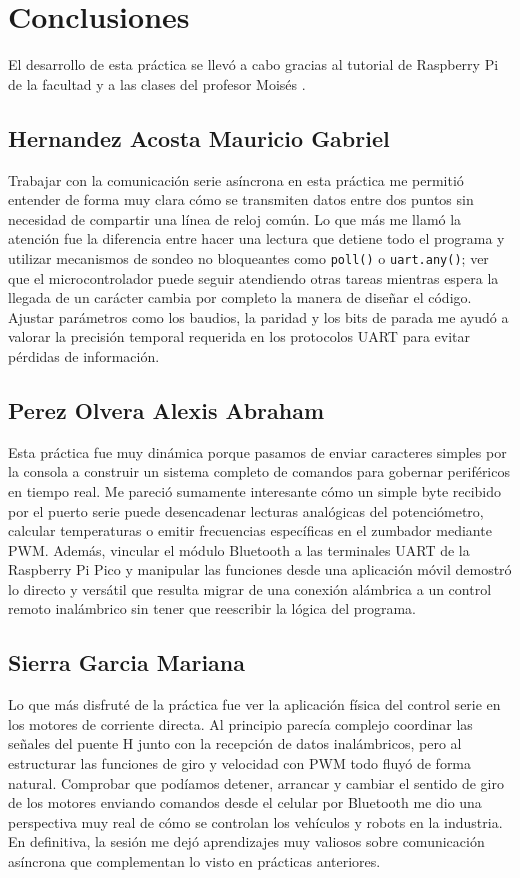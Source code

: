 \section{Conclusiones}

El desarrollo de esta práctica se llevó a cabo gracias al tutorial de Raspberry Pi de la facultad \cite{FI_UNAM_Raspberry_2026} y a las clases del profesor Moisés \cite{Melendez_Reyes_2026}.

\subsection{Hernandez Acosta Mauricio Gabriel}
Trabajar con la comunicación serie asíncrona en esta práctica me permitió entender de forma muy clara cómo se transmiten datos entre dos puntos sin necesidad de compartir una línea de reloj común. Lo que más me llamó la atención fue la diferencia entre hacer una lectura que detiene todo el programa y utilizar mecanismos de sondeo no bloqueantes como \texttt{poll()} o \texttt{uart.any()}; ver que el microcontrolador puede seguir atendiendo otras tareas mientras espera la llegada de un carácter cambia por completo la manera de diseñar el código. Ajustar parámetros como los baudios, la paridad y los bits de parada me ayudó a valorar la precisión temporal requerida en los protocolos UART para evitar pérdidas de información.

\subsection{Perez Olvera Alexis Abraham}
Esta práctica fue muy dinámica porque pasamos de enviar caracteres simples por la consola a construir un sistema completo de comandos para gobernar periféricos en tiempo real. Me pareció sumamente interesante cómo un simple byte recibido por el puerto serie puede desencadenar lecturas analógicas del potenciómetro, calcular temperaturas o emitir frecuencias específicas en el zumbador mediante PWM. Además, vincular el módulo Bluetooth a las terminales UART de la Raspberry Pi Pico y manipular las funciones desde una aplicación móvil demostró lo directo y versátil que resulta migrar de una conexión alámbrica a un control remoto inalámbrico sin tener que reescribir la lógica del programa.

\subsection{Sierra Garcia Mariana}
Lo que más disfruté de la práctica fue ver la aplicación física del control serie en los motores de corriente directa. Al principio parecía complejo coordinar las señales del puente H junto con la recepción de datos inalámbricos, pero al estructurar las funciones de giro y velocidad con PWM todo fluyó de forma natural. Comprobar que podíamos detener, arrancar y cambiar el sentido de giro de los motores enviando comandos desde el celular por Bluetooth me dio una perspectiva muy real de cómo se controlan los vehículos y robots en la industria. En definitiva, la sesión me dejó aprendizajes muy valiosos sobre comunicación asíncrona que complementan lo visto en prácticas anteriores.
